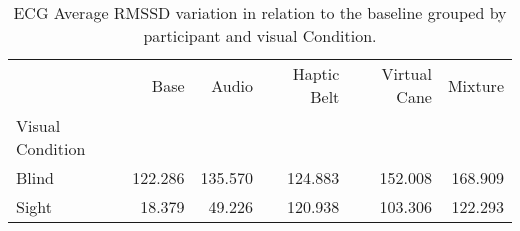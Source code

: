 
\begin{table}[!htb]
\centering
\caption{ECG Average RMSSD variation in relation to the baseline grouped by participant and visual Condition.}
\label{tab:ecg_rmssd_variation_group}
\begin{tabular}{lrrrrr}
\toprule
{} &    Base &   Audio &  Haptic Belt &  Virtual Cane &  Mixture \\
Visual Condition &         &         &              &               &          \\
\midrule
Blind            & 122.286 & 135.570 &      124.883 &       152.008 &  168.909 \\
Sight            &  18.379 &  49.226 &      120.938 &       103.306 &  122.293 \\
\bottomrule
\end{tabular}
\end{table}

